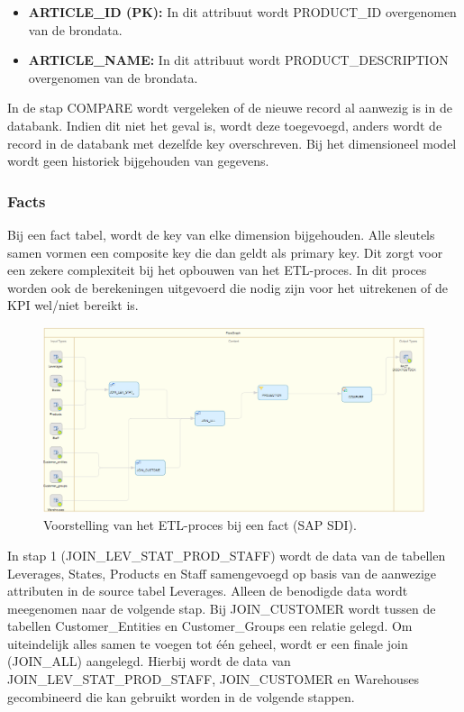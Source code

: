 \begin{itemize}
	\item \textbf{ARTICLE\_ID (PK):} In dit attribuut wordt PRODUCT\_ID overgenomen van de brondata.
	\item \textbf{ARTICLE\_NAME:} In dit attribuut wordt PRODUCT\_DESCRIPTION overgenomen van de brondata.
\end{itemize} 

In de stap COMPARE wordt vergeleken of de nieuwe record al aanwezig is in de databank. Indien dit niet het geval is, wordt deze toegevoegd, anders wordt de record in de databank met dezelfde key overschreven. Bij het dimensioneel model wordt geen historiek bijgehouden van gegevens.

\subsubsection{Facts}
Bij een fact tabel, wordt de key van elke dimension bijgehouden. Alle sleutels samen vormen een composite key die dan geldt als primary key. Dit zorgt voor een zekere complexiteit bij het opbouwen van het ETL-proces. In dit proces worden ook de berekeningen uitgevoerd die nodig zijn voor het uitrekenen of de KPI wel/niet bereikt is.

\begin{figure}[h]
	\centering
	\includegraphics[scale=0.5]{../images/DM_FG_fact.png}
	\caption{Voorstelling van het ETL-proces bij een fact (SAP SDI).}
	\label{fig:DM_FG_fac}
\end{figure}

In stap 1 (JOIN\_LEV\_STAT\_PROD\_STAFF) wordt de data van de tabellen Leverages, States, Products en Staff samengevoegd op basis van de aanwezige attributen in de source tabel Leverages. Alleen de benodigde data wordt meegenomen naar de volgende stap. Bij JOIN\_CUSTOMER wordt tussen de tabellen Customer\_Entities en Customer\_Groups een relatie gelegd. Om uiteindelijk alles samen te voegen tot één geheel, wordt er een finale join (JOIN\_ALL) aangelegd. Hierbij wordt de data van JOIN\_LEV\_STAT\_PROD\_STAFF, JOIN\_CUSTOMER en Warehouses gecombineerd die kan gebruikt worden in de volgende stappen.

